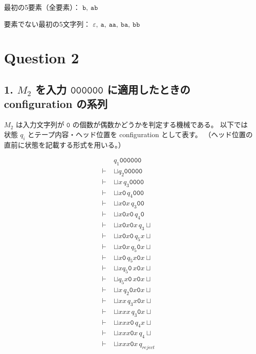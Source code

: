\documentclass[uplatex,a4paper,11pt]{jsarticle}
\begin{document}
最初の5要素（全要素）：
$\mathtt{b},\ \mathtt{ab}$

要素でない最初の5文字列：
$\varepsilon,\ \mathtt{a},\ \mathtt{aa},\ \mathtt{ba},\ \mathtt{bb}$

\section*{Question 2}

\subsection*{1. $M_2$ を入力 $\mathtt{000000}$ に適用したときの configuration の系列}

$M_2$ は入力文字列が $\mathtt{0}$ の個数が偶数かどうかを判定する機械である。
以下では状態 $q_i$ とテープ内容・ヘッド位置を configuration として表す。
（ヘッド位置の直前に状態を記載する形式を用いる。）

\begin{align*}
&q_1\mathtt{000000} \\
\vdash\; &\sqcup q_2\mathtt{00000} \\
\vdash\; &\sqcup x\,q_3\mathtt{0000} \\
\vdash\; &\sqcup x\mathtt{0}\,q_4\mathtt{000} \\
\vdash\; &\sqcup x\mathtt{0}x\,q_3\mathtt{00} \\
\vdash\; &\sqcup x\mathtt{0}x\mathtt{0}\,q_4\mathtt{0} \\
\vdash\; &\sqcup x\mathtt{0}x\mathtt{0}x\,q_3\sqcup \\
\vdash\; &\sqcup x\mathtt{0}x\mathtt{0}\,q_5 x\sqcup \\
\vdash\; &\sqcup x\mathtt{0}x\,q_5\mathtt{0}x\sqcup \\
\vdash\; &\sqcup x\mathtt{0}\,q_5 x\mathtt{0}x\sqcup \\
\vdash\; &\sqcup xq_5 \mathtt{0}\,x\mathtt{0}x\sqcup \\
\vdash\; &\sqcup q_5 x\mathtt{0}\,x\mathtt{0}x\sqcup \\
\vdash\; &\sqcup x\,q_2\mathtt{0}x\mathtt{0}x\sqcup \\
\vdash\; &\sqcup xx\,q_3 x\mathtt{0}x\sqcup \\
\vdash\; &\sqcup xxx\,q_3\mathtt{0}x\sqcup \\
\vdash\; &\sqcup xxx\mathtt{0}\,q_4 x\sqcup \\
\vdash\; &\sqcup xxx\mathtt{0}x\,q_4\sqcup \\
\vdash\; &\sqcup xxx\mathtt{0}x\,q_{reject}
\end{align*}
\end{document}
